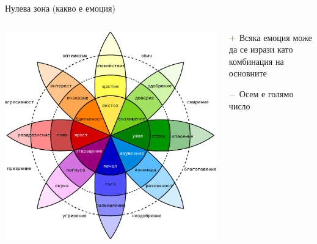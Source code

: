 \documentclass[9pt]{beamer}
\begin{document}
    \begin{frame}{Нулева зона (какво е емоция)}
        \begin{columns}[T] %
            \begin{column}{.53\textwidth}
                \begin{center}
                    \includegraphics[width=\textwidth]{plutchik}%
                \end{center}
            \end{column}%
            \hfill%
            \pause
            \begin{column}{.45\textwidth}
                \vspace{1cm}
                ${\color{mygreen}+}$ Всяка емоция може да се изрази като комбинация на основните
                
                \vspace{2cm}
                \pause
                ${\color{mypink}-}$ Осем е голямо число
            \end{column}%
        \end{columns}
    \end{frame}
\end{document}
